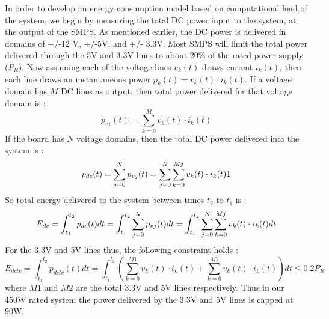 \documentclass[12pt,onecolumn]{ULieeetran}
\begin{document}
In order to develop an energy consumption model based on computational
load of the system, we begin by measuring the total DC power input to
the system, at the output of the SMPS. As mentioned earlier, the DC
power is delivered in domains of +/-12 V, +/-5V, and +/- 3.3V. Most SMPS
will limit the total power delivered through the 5V and 3.3V lines to
about 20\% of the rated power supply ($P_R$). Now assuming each of the
voltage lines $v_k(t)$ draws current $i_k(t)$, then each line draws an
instantaneous power $p_k(t) = v_k(t)\cdot i_k(t)$. If a voltage domain
has $M$ DC lines as output, then total power delivered for that voltage
domain is :
\begin{equation*}
\label{eq:power_vdomain}
p_{v1}(t)=  \sum_{k=0}^{M} v_k(t)\cdot i_k(t)
\end{equation*}
If the board has $N$ voltage domains, then the total DC power delivered
into the system is :
\begin{equation*}
\label{eq:power_vtot}
p_{dc}(t) = \sum_{j=0}^{N} p_{vj}(t)\\
         =  \sum_{j=0}^{N} \sum_{k=0}^{Mj} v_{k}(t)\cdot i_{k}(t)
1\end{equation*}
So total energy delivered to the system between times $t_2$ to $t_1$ is :
\begin{equation*}
\label{eq:energy_vtot}
E_{dc} = \int_{t_1}^{t_2} p_{dc}(t) dt \\
      = \int_{t_1}^{t_2} \sum_{j=0}^{N} p_{vj}(t) dt \\
      = \int_{t_1}^{t_2} \sum_{j=0}^{N} \sum_{k=0}^{Mj} v_{k}(t)\cdot i_{k}(t) dt
\end{equation*}
For the 3.3V and 5V lines thus, the following constraint holds :
\begin{equation*}
\label{eq:power_constr}
E_{dclv} = \int_{t_1}^{t_2} p_{dclv} (t) dt 
        =  \int_{t_1}^{t_2} ( \sum_{k=0}^{M1} v_{k}(t)\cdot i_{k}(t) +
        \sum_{k=0}^{M2} v_{k}(t)\cdot i_{k}(t) ) dt 
         \leq 0.2 P_R
\end{equation*}
where $M1$ and $M2$ are the total 3.3V and 5V lines respectively. Thus
in our 450W rated system the power delivered by the 3.3V and 5V lines is
capped at 90W.
\end{document}
